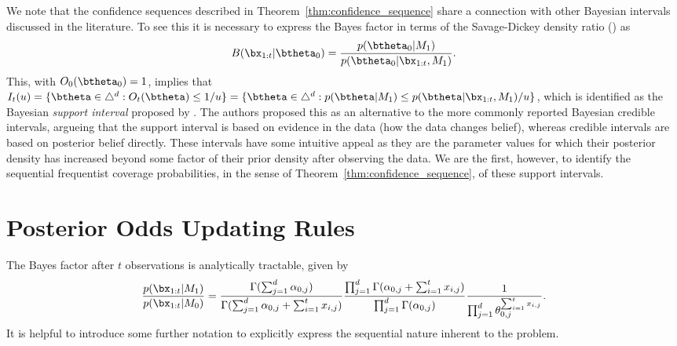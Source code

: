 \documentclass[11pt]{article}
\begin{document}
We note that the confidence sequences described in Theorem~\ref{thm:confidence_sequence} share a connection with other Bayesian intervals discussed in the literature.
To see this it is necessary to express the Bayes factor in terms of the Savage-Dickey density ratio (\cite{dickey}) as
\begin{equation}
    B(\bx_{1:t}|\btheta_0) = \frac{p(\btheta_0| M_1)}{p(\btheta_0|\bx_{1:t},M_1)}.
\end{equation}
This, with $O_0(\btheta_0)=1$, implies that $I_t(u) = \lbrace \btheta \in \triangle^d : O_t(\btheta) \leq 1/u \rbrace = \lbrace \btheta  \in \triangle^d : p(\btheta| M_1)\leq p(\btheta|\bx_{1:t}, M_1)/u \rbrace $, which is identified as the Bayesian \textit{support interval} proposed by \cite{support_interval}.
The authors proposed this as an alternative to the more commonly reported Bayesian credible intervals, argueing that the support interval is based on evidence in the data (how the data changes belief), whereas credible intervals are based on posterior belief directly.
These intervals have some intuitive appeal as they are the parameter values for which their posterior density has increased beyond some factor of their prior density after observing the data.
We are the first, however, to identify the sequential frequentist coverage probabilities, in the sense of Theorem~\ref{thm:confidence_sequence}, of these support intervals.






\appendix
\section{Posterior Odds Updating Rules}
\label{app:posterior_odds}
The Bayes factor after $t$ observations is analytically tractable, given by
\begin{equation}
  \label{eq:bayes_factor}
 \frac{p(\bx_{1:t}|M_1)}{p(\bx_{1:t}|M_0)} = \frac{\Gamma(\sum_{j=1}^{d} \alpha_{0,j})}{\Gamma(\sum_{j=1}^{d} \alpha_{0,j} + \sum_{i=1}^{t}x_{i,j})}\frac{\prod_{j=1}^{d}\Gamma(\alpha_{0,j} + \sum_{i=1}^{t}x_{i,j} )}{\prod_{j=1}^{d}\Gamma(\alpha_{0,j} )}\frac{1}{\prod_{j=1}^{d} \theta_{0,j}^{\sum_{i=1}^{t}x_{i,j}}}.
\end{equation}
It is helpful to introduce some further notation to explicitly express the sequential nature inherent to the problem.
\end{document}
